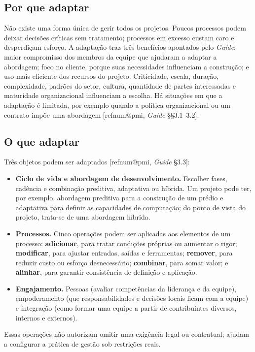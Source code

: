 \documentclass[11pt,a4paper]{article}
\makeatletter
\newcommand{\refnum}[1]{\csname refnum@#1\endcsname}
\makeatother
\begin{document}
\subsection{Por que adaptar}

Não existe uma forma única de gerir todos os projetos. Poucos processos podem deixar decisões críticas sem tratamento; processos em excesso custam caro e desperdiçam esforço. A adaptação traz três benefícios apontados pelo \textit{Guide}: maior compromisso dos membros da equipe que ajudaram a adaptar a abordagem; foco no cliente, porque suas necessidades influenciam a construção; e uso mais eficiente dos recursos do projeto. Criticidade, escala, duração, complexidade, padrões do setor, cultura, quantidade de partes interessadas e maturidade organizacional influenciam a escolha. Há situações em que a adaptação é limitada, por exemplo quando a política organizacional ou um contrato impõe uma abordagem [\refnum{pmi}, \textit{Guide} §§3.1–3.2].
\subsection{O que adaptar}

Três objetos podem ser adaptados [\refnum{pmi}, \textit{Guide} §3.3]:

\begin{itemize}
\item \textbf{Ciclo de vida e abordagem de desenvolvimento.} Escolher fases, cadência e combinação preditiva, adaptativa ou híbrida. Um projeto pode ter, por exemplo, abordagem preditiva para a construção de um prédio e adaptativa para definir as capacidades de computação; do ponto de vista do projeto, trata-se de uma abordagem híbrida.
\item \textbf{Processos.} Cinco operações podem ser aplicadas aos elementos de um processo: \textbf{adicionar}, para tratar condições próprias ou aumentar o rigor; \textbf{modificar}, para ajustar entradas, saídas e ferramentas; \textbf{remover}, para reduzir custo ou esforço desnecessário; \textbf{combinar}, para somar valor; e \textbf{alinhar}, para garantir consistência de definição e aplicação.
\item \textbf{Engajamento.} Pessoas (avaliar competências da liderança e da equipe), empoderamento (que responsabilidades e decisões locais ficam com a equipe) e integração (como formar uma equipe a partir de contribuintes diversos, internos e externos).
\end{itemize}

Essas operações não autorizam omitir uma exigência legal ou contratual; ajudam a configurar a prática de gestão sob restrições reais.
\end{document}

